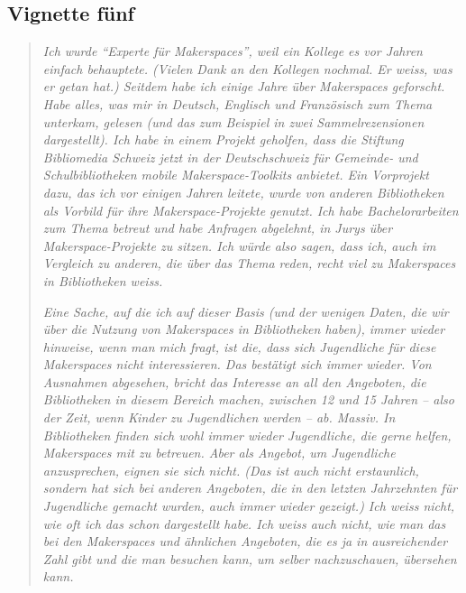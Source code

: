 \documentclass[a4paper,
fontsize=11pt,
oneside,
numbers=noperiodatend,
parskip=half-,
bibliography=totoc,
final
]{scrartcl}
\begin{document}
\hypertarget{vignette-fuxfcnf}{%
\subsection{Vignette fünf}\label{vignette-fuxfcnf}}

\begin{quote}
\emph{Ich wurde \enquote{Experte für Makerspaces}, weil ein Kollege es
vor Jahren einfach behauptete. (Vielen Dank an den Kollegen nochmal. Er
weiss, was er getan hat.) Seitdem habe ich einige Jahre über Makerspaces
geforscht. Habe alles, was mir in Deutsch, Englisch und Französisch zum
Thema unterkam, gelesen (und das zum Beispiel in zwei Sammelrezensionen
dargestellt). Ich habe in einem Projekt geholfen, dass die Stiftung
Bibliomedia Schweiz jetzt in der Deutschschweiz für Gemeinde- und
Schulbibliotheken mobile Makerspace-Toolkits anbietet. Ein Vorprojekt
dazu, das ich vor einigen Jahren leitete, wurde von anderen Bibliotheken
als Vorbild für ihre Makerspace-Projekte genutzt. Ich habe
Bachelorarbeiten zum Thema betreut und habe Anfragen abgelehnt, in Jurys
über Makerspace-Projekte zu sitzen. Ich würde also sagen, dass ich, auch
im Vergleich zu anderen, die über das Thema reden, recht viel zu
Makerspaces in Bibliotheken weiss.}

\emph{Eine Sache, auf die ich auf dieser Basis (und der wenigen Daten,
die wir über die Nutzung von Makerspaces in Bibliotheken haben), immer
wieder hinweise, wenn man mich fragt, ist die, dass sich Jugendliche für
diese Makerspaces nicht interessieren. Das bestätigt sich immer wieder.
Von Ausnahmen abgesehen, bricht das Interesse an all den Angeboten, die
Bibliotheken in diesem Bereich machen, zwischen 12 und 15 Jahren -- also
der Zeit, wenn Kinder zu Jugendlichen werden -- ab. Massiv. In
Bibliotheken finden sich wohl immer wieder Jugendliche, die gerne
helfen, Makerspaces mit zu betreuen. Aber als Angebot, um Jugendliche
anzusprechen, eignen sie sich nicht. (Das ist auch nicht erstaunlich,
sondern hat sich bei anderen Angeboten, die in den letzten Jahrzehnten
für Jugendliche gemacht wurden, auch immer wieder gezeigt.) Ich weiss
nicht, wie oft ich das schon dargestellt habe. Ich weiss auch nicht, wie
man das bei den Makerspaces und ähnlichen Angeboten, die es ja in
ausreichender Zahl gibt und die man besuchen kann, um selber
nachzuschauen, übersehen kann.}


\end{quote}
\end{document}

